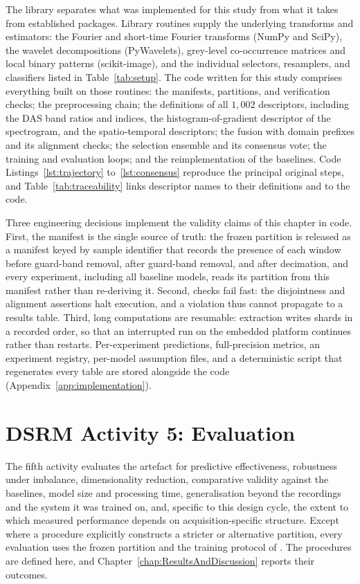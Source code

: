 The library separates what was implemented for this study from what it takes from established packages. Library routines supply the underlying transforms and estimators: the Fourier and short-time Fourier transforms (NumPy and SciPy), the wavelet decompositions (PyWavelets), grey-level co-occurrence matrices and local binary patterns (scikit-image), and the individual selectors, resamplers, and classifiers listed in Table~\ref{tab:setup}. The code written for this study comprises everything built on those routines: the manifests, partitions, and verification checks; the preprocessing chain; the definitions of all $1{,}002$ descriptors, including the DAS band ratios and indices, the histogram-of-gradient descriptor of the spectrogram, and the spatio-temporal descriptors; the fusion with domain prefixes and its alignment checks; the selection ensemble and its consensus vote; the training and evaluation loops; and the reimplementation of the baselines. Code Listings~\ref{lst:trajectory} to~\ref{lst:consensus} reproduce the principal original steps, and Table~\ref{tab:traceability} links descriptor names to their definitions and to the code.

Three engineering decisions implement the validity claims of this chapter in code. First, the manifest is the single source of truth: the frozen partition is released as a manifest keyed by sample identifier that records the presence of each window before guard-band removal, after guard-band removal, and after decimation, and every experiment, including all baseline models, reads its partition from this manifest rather than re-deriving it. Second, checks fail fast: the disjointness and alignment assertions halt execution, and a violation thus cannot propagate to a results table. Third, long computations are resumable: extraction writes shards in a recorded order, so that an interrupted run on the embedded platform continues rather than restarts. Per-experiment predictions, full-precision metrics, an experiment registry, per-model assumption files, and a deterministic script that regenerates every table are stored alongside the code (Appendix~\ref{app:implementation}).

\section{DSRM Activity 5: Evaluation}
\label{sec:chap3DSRMEvaluation}
The fifth activity evaluates the artefact for predictive effectiveness, robustness under imbalance, dimensionality reduction, comparative validity against the baselines, model size and processing time, generalisation beyond the recordings and the system it was trained on, and, specific to this design cycle, the extent to which measured performance depends on acquisition-specific structure. Except where a procedure explicitly constructs a stricter or alternative partition, every evaluation uses the frozen partition and the training protocol of . The procedures are defined here, and Chapter~\ref{chap:ResultsAndDiscussion} reports their outcomes.

